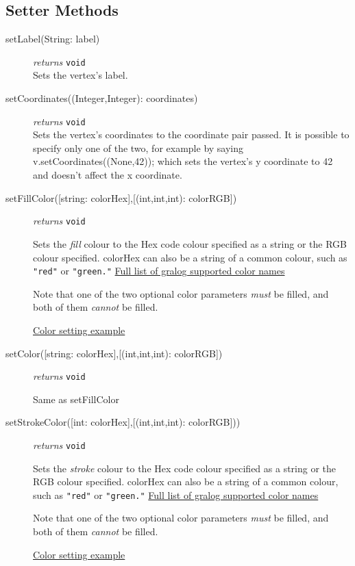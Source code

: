 \documentclass{article}
\newcounter{example}
\begin{document}
\subsection{Setter Methods}
\begin{description}
\item[setLabel(String: label)]\emph{returns}
  \texttt{void}\\
Sets the vertex's label.

\item[setCoordinates((Integer,Integer): coordinates)]\emph{returns}
  \texttt{void}\\
Sets the vertex's coordinates to the coordinate pair passed. It is possible to specify only one of the two, for example by saying v.setCoordinates((None,42)); which sets the vertex's y coordinate to 42 and doesn't affect the x coordinate.

\item[setFillColor({[string: colorHex]},{[(int,int,int): colorRGB]})]\emph{returns}
  \texttt{void}

Sets the \textit{fill} colour to the Hex code colour
specified as a string or the RGB colour specified. colorHex can also be
a string of a common colour, such as \texttt{"red"} or
\texttt{"green."} \hyperref[colorNamesSupportedByGralog]{Full list of gralog supported color names}

Note that one of the two optional color parameters \textit{must} be filled, and both of them \textit{cannot} be filled.

\hyperref[colorNamesSupportedByGralog]{Color setting example}

\item[setColor({[string: colorHex]},{[(int,int,int): colorRGB]})]\emph{returns}
  \texttt{void}
  
Same as setFillColor

\item[setStrokeColor({[int: colorHex]},{[(int,int,int): colorRGB]}))] \emph{returns} \texttt{void}

Sets the \textit{stroke} colour to the Hex code colour
specified as a string or the RGB colour specified. colorHex can also be
a string of a common colour, such as \texttt{"red"} or
\texttt{"green."} \hyperref[colorNamesSupportedByGralog]{Full list of gralog supported color names}

Note that one of the two optional color parameters \textit{must} be filled, and both of them \textit{cannot} be filled.

\hyperref[colorNamesSupportedByGralog]{Color setting example}


\end{description}
\end{document}
